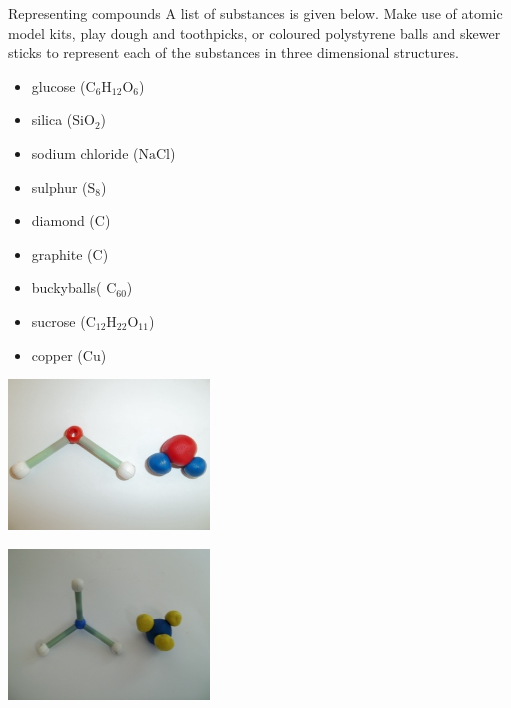 \begin{activity}{Representing compounds}
A list of substances is given below. Make use of atomic model kits, play dough and toothpicks, or coloured polystyrene balls and skewer sticks to represent each of the substances in three dimensional structures.\\
\begin{minipage}{.4\textwidth}
\begin{itemize}[noitemsep]
 \item glucose ($\text{C}_{6}\text{H}_{12}\text{O}_{6}$)
\item silica ($\text{SiO}_{2}$)
\item sodium chloride ($\text{NaCl}$)
\item sulphur ($\text{S}_{8}$)
\item diamond ($\text{C}$)
\item graphite ($\text{C}$)
\item buckyballs( $\text{C}_{60}$)
\item sucrose ($\text{C}_{12}\text{H}_{22}\text{O}_{11}$)
\item copper ($\text{Cu}$)
\end{itemize}
\end{minipage}
\begin{minipage}{.6\textwidth}
\begin{center}
\includegraphics[width=0.4\textwidth]{photos/water.jpg}
\end{center}  
\begin{center}
\includegraphics[width=0.4\textwidth]{photos/ammonia.jpg}
\end{center}
\end{minipage}
\end{activity}
